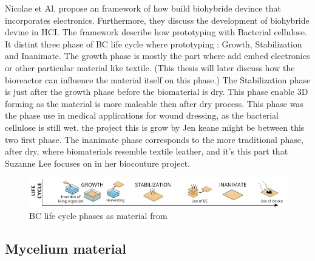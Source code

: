 Nicolae et Al. propose an framework \cite{nicolae2023biohybrid} of how build biohybride devince that incorporates electronics. 
Furthermore, they discuss the development of biohybride devine in HCI. The framework describe how prototyping with Bacterial cellulose. It distint three phase of BC life cycle where prototyping : Growth, Stabilization and Inanimate. 
The growth phase is mostly the part where add embed electronics or other particular material like textile. (This thesis will later discuss how the bioreactor can influence the material itself on this phase.)
The Stabilization phase is just after the growth phase before the biomaterial is dry. This phase enable 3D forming as the material is more maleable then after dry process. This phase was the phase use in medical applications for wound dressing, as the bacterial cellulose is still wet. the project this is grow by Jen keane might be between this two first phase.
The inanimate phase corresponds to the more traditional phase, after dry, where biomaterials resemble textile leather, and it's this part that Suzanne Lee focuses on in her biocouture project. 

\begin{figure}[h]
    \centering
    \includegraphics[width=1.4\textwidth]{images/phase-proto.png}
    \caption{BC life cycle phases as material from\cite{nicolae2023biohybrid}}
    \label{fig:life cycle}
\end{figure}




\subsection{Mycelium material}



